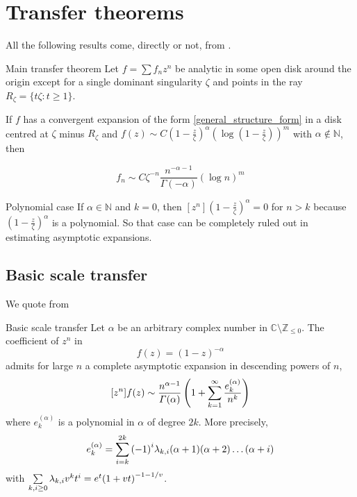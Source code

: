 \documentclass[../main.tex]{subfiles}
\begin{document}
\section{Transfer theorems}

All the following results come, directly or not, from \cite{Flajolet1990}.

\begin{thm}{Main transfer theorem}
	Let $f = \sum f_n z^n$ be analytic in some open disk around the origin except for a single dominant singularity $\zeta$ and points in the ray	$R_\zeta = \{t \zeta : t \geq 1 \}$.
	
	If $f$ has a convergent expansion of the form \eqref{general_structure_form} in a disk centred at $\zeta$ minus $R_\zeta$ and $f(z) \sim C {\left( 1 - \frac{z}{\zeta} \right)}^\alpha {\left(\log \left( 1 - \frac{z}{\zeta} \right)\right)}^m$ with $\alpha \not\in \mathbb{N}$,	
	then
	
	$$f_n \sim C {\zeta}^{-n} \frac{n^{-\alpha - 1}}{\Gamma(-\alpha)} {(\log n)}^m$$
\end{thm}

\begin{thm}{Polynomial case}
	If $\alpha \in \mathbb{N}$ and $k = 0$, then $[z^n]{\left(1 - \frac{z}{\zeta}\right)}^\alpha = 0$ for $n > k$
	because~${\left(1 - \frac{z}{\zeta}\right)}^\alpha$ is a polynomial. So that case can be completely ruled out in estimating asymptotic expansions.
\end{thm}


\subsection{Basic scale transfer}

We quote from \cite{Flajolet2009}

\begin{thm}{Basic scale transfer}
	Let $\alpha$ be an arbitrary complex number in
	$\mathbb{C} \setminus \mathbb{Z}_{\leq 0}$.
	The coefficient of $z^n$ in
	\[
	f(z) = {(1 - z)}^{-\alpha}
	\]
	admits for large $n$ a complete asymptotic expansion in descending powers of $n$,
	\[
	[z^n]f(z) \sim \frac{n^{\alpha - 1}}{\Gamma(\alpha)}
	\left(1 + \sum\limits_{k = 1}^{\infty} \frac{e_k^{(\alpha)}}{n^k} \right)
	\]
	where $e_k^{(\alpha)}$ is a polynomial in $\alpha$ of degree $2k$.
	More precisely,
	\[
	e_k^{(\alpha)} = \sum\limits_{i = k}^{2k} {(-1)}^i \lambda_{k, i} (\alpha + 1) (\alpha + 2) \dots (\alpha + i)
	\]
	with $\sum\limits_{k, i \geq 0} \lambda_{k, i} v^k t^i = e^t {(1 + vt)}^{-1 - 1/v}$.
\end{thm}
\end{document}
